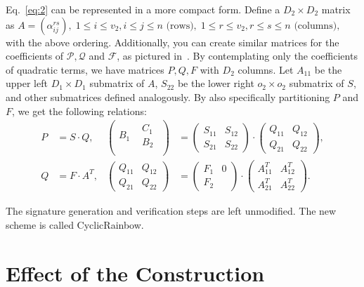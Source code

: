 \documentclass[a4paper, 14pt]{extarticle}
\begin{document}
Eq.~\ref{eq:2} can be represented in a more compact form. Define a $D_{2} \times D_{2}$ matrix as
$
    A = (\alpha_{ij}^{rs}),\; 1 \leq i \leq v_{2}, i \leq j \leq n \text{ (rows)},\; 1 \leq r \leq v_{2}, r \leq s \leq n \text{ (columns)},
$
with the above ordering. Additionally, you can create similar matrices for the coefficients of $\mathcal{P}, \mathcal{Q}$ and $\mathcal{F}$, as pictured in~\cite[Figure 7.5]{Petzoldt:phd:2013:jul}. By contemplating only the coefficients of quadratic terms, we have matrices $P, Q, F$ with $D_{2}$ columns. Let $A_{11}$ be the upper left $D_{1} \times D_{1}$ submatrix of $A$, $S_{22}$ be the lower right $o_{2} \times o_{2}$ submatrix of $S$, and other submatrices defined analogously. By also specifically partitioning $P$ and $F$, we get the following relations:
\begin{align}
    P &= S \cdot Q, & 
    \begin{pmatrix}
        B_{1} & \begin{matrix} C_{1} \\ B_{2} \end{matrix} \\
    \end{pmatrix} &=
    \begin{pmatrix}
        S_{11} & S_{12} \\
        S_{21} & S_{22}
    \end{pmatrix} \cdot
    \begin{pmatrix}
        Q_{11} & Q_{12} \\
        Q_{21} & Q_{22}
    \end{pmatrix}, \\
    Q &= F \cdot A^{T}, & 
    \begin{pmatrix}
        Q_{11} & Q_{12} \\
        Q_{21} & Q_{22}
    \end{pmatrix} &=
    \begin{pmatrix}
        F_{1} & 0 \\
    F_{2}
    \end{pmatrix} \cdot
    \begin{pmatrix}
        A_{11}^{T} & A_{12}^{T} \\
        A_{21}^{T} & A_{22}^{T}
    \end{pmatrix}.
\end{align}

The signature generation and verification steps are left unmodified. The new scheme is called CyclicRainbow.

\section{Effect of the Construction}\label{sec:effect}
\end{document}
